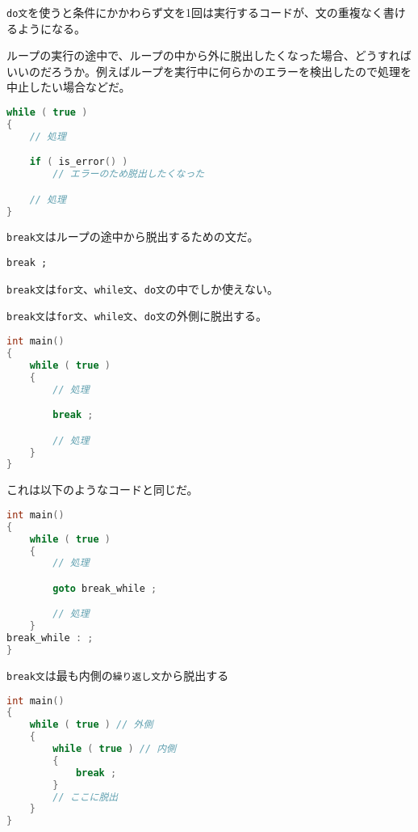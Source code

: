 \texttt{do文}を使うと条件にかかわらず文を1回は実行するコードが、文の重複なく書けるようになる。

\ifTombow\pagebreak\fi
{}

ループの実行の途中で、ループの中から外に脱出したくなった場合、どうすればいいのだろうか。例えばループを実行中に何らかのエラーを検出したので処理を中止したい場合などだ。

\begin{lstlisting}[language={C++}]
while ( true )
{
    // 処理

    if ( is_error() )
        // エラーのため脱出したくなった

    // 処理
}
\end{lstlisting}

\texttt{break文}はループの途中から脱出するための文だ。

\begin{lstlisting}[style=grammar]
break ;
\end{lstlisting}

\texttt{break文}は\texttt{for文}、\texttt{while文}、\texttt{do文}の中でしか使えない。

\texttt{break文}は\texttt{for文}、\texttt{while文}、\texttt{do文}の外側に脱出する。

\begin{lstlisting}[language={C++}]
int main()
{
    while ( true )
    {
        // 処理

        break ;

        // 処理
    }
}
\end{lstlisting}

これは以下のようなコードと同じだ。

\begin{lstlisting}[language={C++}]
int main()
{
    while ( true )
    {
        // 処理

        goto break_while ;

        // 処理
    }
break_while : ;
}
\end{lstlisting}

\texttt{break文}は最も内側の\texttt{繰り返し文}から脱出する

\begin{lstlisting}[language={C++}]
int main()
{
    while ( true ) // 外側
    {
        while ( true ) // 内側
        {
            break ;
        }
        // ここに脱出
    }
}
\end{lstlisting}


